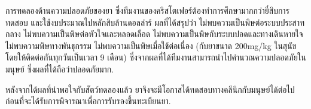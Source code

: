 {\begin{shaded}
%
%
%
%
%
%

การทดลองด้านความปลอดภัยของยา ซึ่งทีมงานของคริสโตเฟอร์ต้องทำการศึกษามากกว่ายี่สิบการทดสอบ
และใช้งบประมาณไปหลักสิบล้านดอลล่าร์
ผลที่ได้สรุปว่า ไม่พบความเป็นพิษต่อระบบประสาทกลาง ไม่พบความเป็นพิษต่อหัวใจและหลอดเลือด ไม่พบความเป็นพิษกับระบบปอดและทางเดินหายใจ
ไม่พบความพิษทางพันธุกรรม ไม่พบความเป็นพิษเมื่อใช้ต่อเนื่อง (กับยาขนาด 200mg/kg ในสุนัข โดยให้ติดต่อกันทุกวันเป็นเวลา 9 เดือน)
ซึ่งจากผลที่ได้ทีมงานสามารถนำไปคำนวณความปลอดภัยในมนุษย์ ซึ่งผลที่ได้ถือว่าปลอดภัยมาก.


หลังจากได้ผลที่น่าพอใจกับสัตว์ทดลองแล้ว
ยาจึงจะมีโอกาสได้ทดสอบทางคลีนิกกับมนุษย์ได้ต่อไป ก่อนที่จะได้รับการพิจารณาเพื่อการรับรองขึ้นทะเบียนยา.





\end{shaded}}
